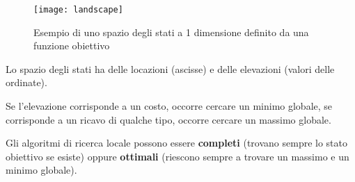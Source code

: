 \begin{figure}[H]
\centering
\texttt{[image: landscape]}
\caption{Esempio di uno spazio degli stati a 1 dimensione definito da una
funzione obiettivo}
\label{fig:landscape}
\end{figure}

Lo spazio degli stati ha delle locazioni (ascisse) e delle elevazioni
(valori delle ordinate).

Se l'elevazione corrisponde a un costo, occorre cercare un minimo globale,
se corrisponde a un ricavo di qualche tipo, occorre cercare un massimo globale.

Gli algoritmi di ricerca locale possono essere \textbf{completi} (trovano
sempre lo stato obiettivo se esiste) oppure \textbf{ottimali} (riescono sempre a
trovare un massimo e un minimo globale).
